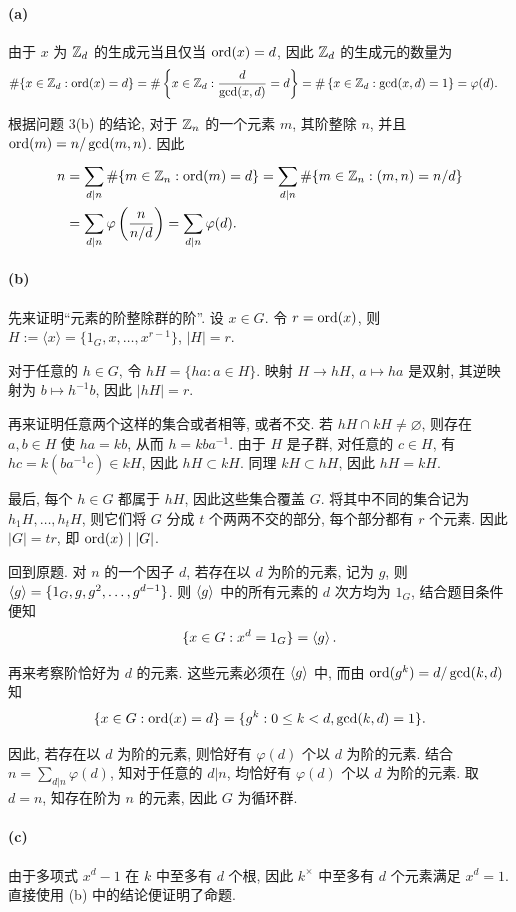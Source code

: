 \documentclass{article}
\begin{document}
\begin{solution}
	\paragraph{(a)} 由于 $x$ 为 $\mathbb{Z}_d$ 的生成元当且仅当 $\operatorname{ord}(x) = d$, 因此 $\mathbb{Z}_d$ 的生成元的数量为
	\begin{align*}
		\# \{x \in \mathbb{Z}_d: \operatorname{ord}(x) = d\}
		&= \# \left\{x \in \mathbb{Z}_d: \frac{d}{\gcd (x,d)}=d\right\}
		= \# \left\{ x\in \mathbb{Z}_d: \gcd (x,d) = 1 \right\}
		= \varphi(d).
	\end{align*}

	根据问题 3(b) 的结论, 对于 $\mathbb{Z}_n$ 的一个元素 $m$, 其阶整除 $n$, 并且 $\operatorname{ord}(m) = n/\gcd (m,n)$. 因此
	\begin{align*}
		n 
		&= \sum_{d|n}^{} \#\{m \in \mathbb{Z}_n: \operatorname{ord}(m) = d\}
		= \sum_{d|n}^{} \#\{m \in \mathbb{Z}_n: (m,n) = n/d\} \\
		&= \sum_{d|n}^{} \varphi \left( \frac{n}{n/d} \right)
		= \sum_{d|n}^{} \varphi(d).
	\end{align*}

	\paragraph{(b)} 先来证明``元素的阶整除群的阶''. 
	设 $x \in G$. 令 $r = \operatorname{ord}(x)$, 则 $H := \langle x\rangle = \{1_G,x,\ldots,x^{r-1}\}$, $|H| = r$.

	对于任意的 $h \in G$, 令 $hH = \{ha:a \in H\}$. 映射 $H \to hH$, $a \mapsto ha$ 是双射, 其逆映射为 $b \mapsto h^{-1}b$, 因此 $|hH| = r$.

	再来证明任意两个这样的集合或者相等, 或者不交. 若 $hH \cap kH \neq \varnothing$, 则存在 $a,b \in H$ 使 $ha = kb$, 从而 $h = kba^{-1}$. 由于 $H$ 是子群, 对任意的 $c \in H$, 有 $hc = k(ba^{-1}c) \in kH$, 因此 $hH \subset kH$. 同理 $kH \subset hH$, 因此 $hH = kH$.

	最后, 每个 $h \in G$ 都属于 $hH$, 因此这些集合覆盖 $G$. 将其中不同的集合记为 $h_1H,\ldots,h_tH$, 则它们将 $G$ 分成 $t$ 个两两不交的部分, 每个部分都有 $r$ 个元素. 因此 $|G| = tr$, 即 $\operatorname{ord}(x) \mid |G|$.

	回到原题. 对 $n$ 的一个因子 $d$, 若存在以 $d$ 为阶的元素, 记为 $g$, 则 $\left\langle g \right\rangle = \{1_G, g, g^{2}, \dots, g^{d-1}\}$. 则 $\left\langle g \right\rangle$ 中的所有元素的 $d$ 次方均为 $1_G$, 结合题目条件便知
	\[ \{x \in G: x^{d} = 1_G\} = \left\langle g \right\rangle. \]

	再来考察阶恰好为 $d$ 的元素. 这些元素必须在 $\left\langle g \right\rangle$ 中, 而由 $\operatorname{ord}(g^{k}) = d/\gcd(k,d)$ 知
	\[ \{x \in G: \operatorname{ord}(x) = d\} = \{g^{k}: 0\le k<d, \gcd(k,d) = 1\}. \]

	因此, 若存在以 $d$ 为阶的元素, 则恰好有 $\varphi(d)$ 个以 $d$ 为阶的元素. 结合 $n = \sum_{d|n}^{}\varphi(d)$, 知对于任意的 $d|n$, 均恰好有 $\varphi(d)$ 个以 $d$ 为阶的元素. 取 $d = n$, 知存在阶为 $n$ 的元素, 因此 $G$ 为循环群.

	\paragraph{(c)} 由于多项式 $x^d - 1$ 在 $k$ 中至多有 $d$ 个根, 因此 $k^\times$ 中至多有 $d$ 个元素满足 $x^{d} = 1$. 直接使用 (b) 中的结论便证明了命题.
\end{solution}
\end{document}
